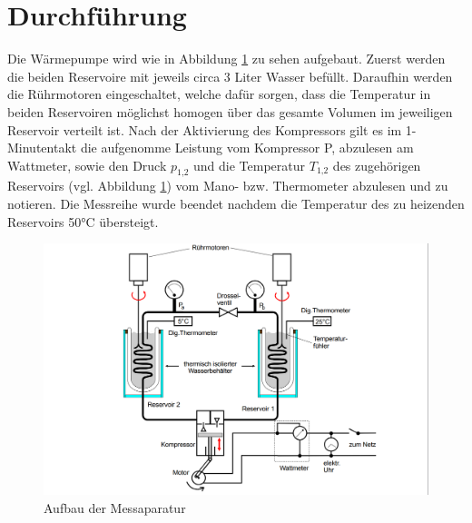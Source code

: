 \section{Durchführung}
    \label{sec:Durchführung}
    Die Wärmepumpe wird wie in Abbildung \ref {fig:aufbau} zu sehen aufgebaut. 
    Zuerst werden die beiden Reservoire mit jeweils circa 3 Liter Wasser befüllt.
    Daraufhin werden die Rührmotoren eingeschaltet, welche dafür sorgen,
    dass die Temperatur in beiden Reservoiren möglichst homogen über das gesamte Volumen im jeweiligen Reservoir verteilt ist.
    Nach der Aktivierung des Kompressors gilt es im 1-Minutentakt die aufgenomme Leistung vom Kompressor P, abzulesen am Wattmeter,
    sowie den Druck $p_\text{1,2}$ und die Temperatur $T_\text{1,2}$ des zugehörigen Reservoirs (vgl. Abbildung \ref {fig:aufbau})
    vom Mano- bzw. Thermometer abzulesen und zu notieren. Die Messreihe wurde beendet nachdem die Temperatur des zu heizenden Reservoirs 50°C übersteigt.
    \begin{figure}
        \centering
        \includegraphics[width=\textwidth]{content/aufbau.png}
        \caption{Aufbau der Messaparatur \cite[197]{206}}
        \label{fig:aufbau}
    \end{figure}